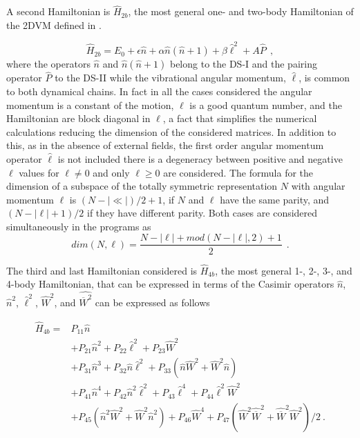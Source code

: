 \documentclass[a4paper,12pt,captions=tableheading]{article}
\begin{document}
A second Hamiltonian is \(\hat H_{2b}\), the most general one- and two-body Hamiltonian of the 2DVM defined in \cite{Iachello1996}. 

\begin{equation}
\hat H_{2b} = E_0+\epsilon {\hat n} + \alpha {\hat n} ({\hat n}+1) + \beta
{\hat \ell}^2 + A \hat P~~,
\label{ham2b}
\end{equation}
\noindent where the operators \({\hat n}\) and \({\hat n} ({\hat
n}+1)\) belong to the DS-I and the pairing operator \(\hat P\) to the
DS-II while the vibrational angular momentum, \(\hat\ell\), is common
to both dynamical chains. In fact in all the cases considered the
angular momentum is a constant of the motion, \(\ell\) is a good
quantum number, and the Hamiltonian are block diagonal in \(\ell\), a
fact that simplifies the numerical calculations reducing the dimension
of the considered matrices. In addition to this, as in the absence of
external fields, the first order angular momentum operator
\(\hat\ell\) is not included there is a degeneracy between positive
and negative \(\ell\) values for \(\ell\ne 0\) and only \(\ell\ge0\)
are considered. The formula for the dimension of a subspace of the
totally symmetric representation \(N\) with angular momentum \(\ell\)
is \((N-|\ll|)/2 + 1\), if \(N\) and \(\ell\) have the same parity,
and \((N-|\ell|+1)/2\) if they have different parity. Both cases are
considered simultaneously in the programs as
\begin{equation}
dim(N,\ell) = \frac{N-|\ell|+mod(N-|\ell|,2)+1}{2}~~.
\end{equation}

The third and last Hamiltonian considered is \(\hat H_{4b}\), the most
general 1-, 2-, 3-, and 4-body Hamiltonian, that can be expressed in
terms of the Casimir operators \({\hat n}\), \({\hat n}^2\), \({\hat
\ell}^2\), \(\hat W^2\), and \(\hat{\overline{W}^2}\) can be expressed
as follows

\begin{align}
\hat H_{4b} =& P_{11} \hat n \nonumber\\
& + P_{21} \hat n^2 + P_{22} \hat \ell^2 + P_{23} \hat W^2 \nonumber\\
& + P_{31} \hat n^3 + P_{32} \hat n \hat \ell^2 + P_{33} (\hat n \hat W^2 + \hat W^2 \hat n) \label{H4b}\\
& + P_{41} \hat n^4 + P_{42} \hat n^2 \hat \ell^2 + P_{43} \hat \ell^4 + P_{44} \hat \ell^2 \hat W^2 \nonumber\\
& + P_{45} (\hat n^2 \hat W^2 + \hat W^2 \hat n^2) + P_{46} \hat W^4 + P_{47} (\hat {W}^2 \hat {\overline{W}}^2 + \hat {\overline{W}}^2 \hat W^2)/2~.\nonumber
\end{align}
\end{document}
